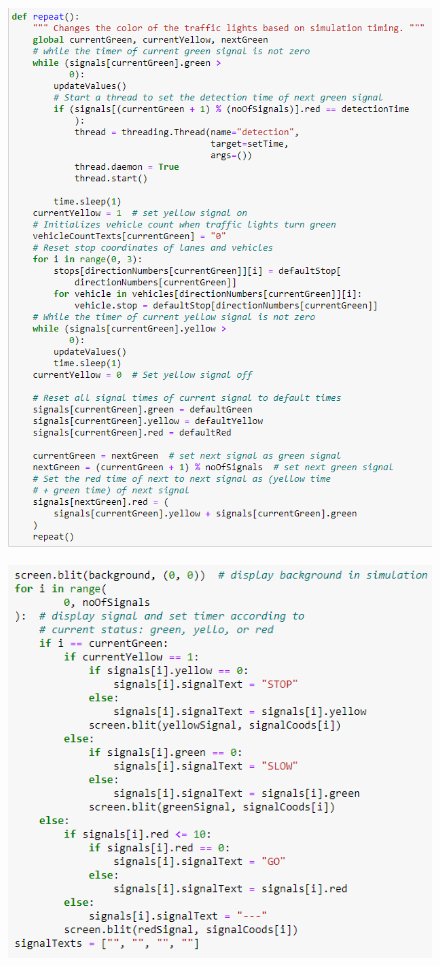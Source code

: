 \documentclass[12pt, a4paper,titlepage]{article}
\begin{document}
\begin{figure}[H]
	\centering
	\includegraphics[width=\linewidth]{images/c4}
	\caption{}
	\label{fig:c4}
\end{figure}

\begin{figure}[H]
	\centering
	\includegraphics[width=\linewidth]{images/c1}
	\caption{}
	\label{fig:c1}
\end{figure}
\end{document}
